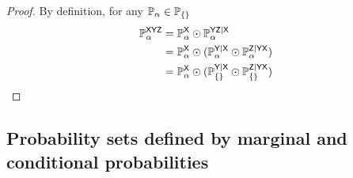 \begin{proof}
By definition, for any $\mathbb{P}_\alpha\in \mathbb{P}_{\{\}}$
\begin{align}
	\mathbb{P}_\alpha^{\mathsf{XYZ}} &= \mathbb{P}_\alpha^{\mathsf{X}}\odot \mathbb{P}_\alpha^{\mathsf{YZ}|\mathsf{X}}\\
							   &= \mathbb{P}_\alpha^{\mathsf{X}}\odot(\mathbb{P}_\alpha^{\mathsf{Y}|\mathsf{X}}\odot \mathbb{P}_\alpha^{\mathsf{Z}|\mathsf{YX}})\\
							   &= \mathbb{P}_\alpha^{\mathsf{X}}\odot(\mathbb{P}_{\{\}}^{\mathsf{Y}|\mathsf{X}}\odot \mathbb{P}_{\{\}}^{\mathsf{Z}|\mathsf{YX}})
\end{align}
\end{proof}







\subsection{Probability sets defined by marginal and conditional probabilities}

